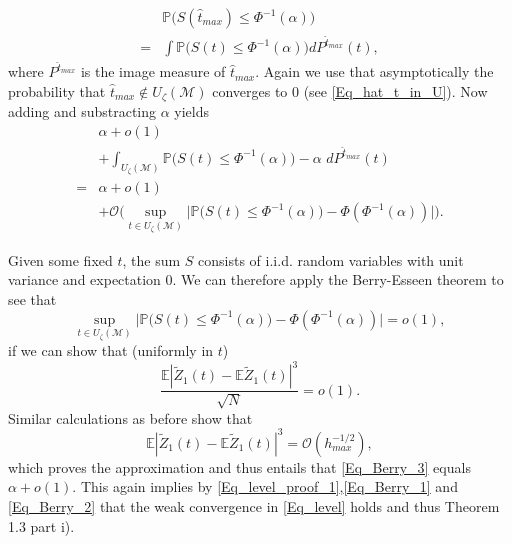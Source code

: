 \documentclass[conference]{IEEEtran}
\begin{document}
\begin{align} \label{Eq_Berry_2}
     &\mathbb{P}\Big(   S(\hat t_{max})   \le \Phi^{-1}(\alpha) \Big) \\
    = & \int \mathbb{P}\Big(   S(t)   \le \Phi^{-1}(\alpha) \Big) d P^{\hat t_{max}}(t),\nonumber
\end{align}
where $P^{\hat t_{max}}$ is the image measure of $\hat t_{max}$.
Again we use that asymptotically the probability that $\hat t_{max} \not \in U_{\zeta}(\mathcal{M})$ converges to $0$ (see \eqref{Eq_hat_t_in_U}).  Now adding and substracting $\alpha$ yields 
\begin{align} \label{Eq_Berry_3}
& \alpha +o(1)\\
& +\int_{U_{\zeta}(\mathcal{M})} \mathbb{P}\Big(   S(t)   \le \Phi^{-1}(\alpha) \Big) - \alpha \,\, d P^{\hat t_{max}}(t) \nonumber\\
= & \alpha + o(1)\nonumber\\
&+\mathcal{O}\Big( \sup_{t \in U_{\zeta}(\mathcal{M})}\big|\mathbb{P}\Big(   S(t)   \le \Phi^{-1}(\alpha) \Big) - \Phi(\Phi^{-1}(\alpha)) \big|\Big). \nonumber
\end{align} 

Given some fixed $t$, the sum $S$ consists of i.i.d. random variables with unit variance and expectation $0$. We can therefore apply the Berry-Esseen theorem to see that 
$$
\sup_{t \in U_{\zeta}(\mathcal{M})}\big|\mathbb{P}\Big(   S(t)   \le \Phi^{-1}(\alpha) \Big) - \Phi(\Phi^{-1}(\alpha)) \big| = o(1),
$$
if we can show that (uniformly in $t$)
$$
\frac{\mathbb{E}|\tilde Z_1(t)-\mathbb{E}\tilde Z_1(t)|^3}{\sqrt{N}} =o(1).
$$
Similar calculations as before show that 
$$
\mathbb{E}|\tilde Z_1(t)-\mathbb{E}\tilde Z_1(t)|^3 = \mathcal{O}(h_{max}^{-1/2}),
$$
which proves the approximation and thus entails that \eqref{Eq_Berry_3} equals $\alpha +o(1)$. This again implies by \eqref{Eq_level_proof_1},\eqref{Eq_Berry_1} and \eqref{Eq_Berry_2}
that the weak convergence in \eqref{Eq_level} holds and thus Theorem 1.3 part i).
\end{document}

